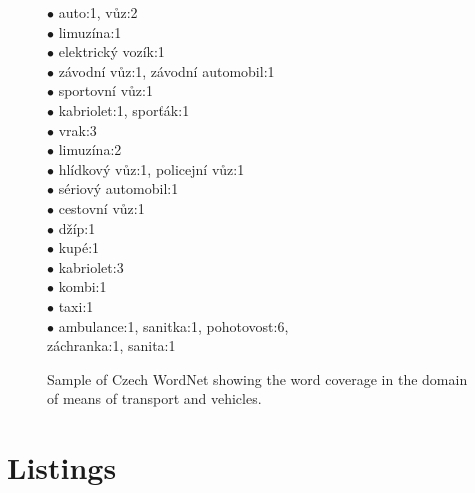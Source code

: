 \begin{figure}
{{\begin{multicols}{2}
\hspace*{0cm}$\bullet$ auto:1, vůz:2\\
\hspace*{1cm}$\bullet$ limuzína:1\\
\hspace*{1cm}$\bullet$ elektrický vozík:1\\
\hspace*{1cm}$\bullet$ závodní vůz:1, závodní automobil:1\\
\hspace*{1cm}$\bullet$ sportovní vůz:1\\
\hspace*{1cm}$\bullet$ kabriolet:1, sporťák:1\\
\hspace*{1cm}$\bullet$ vrak:3\\
\hspace*{1cm}$\bullet$ limuzína:2\\
\hspace*{1cm}$\bullet$ hlídkový vůz:1, policejní vůz:1\\
\hspace*{1cm}$\bullet$ sériový automobil:1\\
\hspace*{1cm}$\bullet$ cestovní vůz:1\\
\hspace*{1cm}$\bullet$ džíp:1\\
\hspace*{1cm}$\bullet$ kupé:1\\
\hspace*{1cm}$\bullet$ kabriolet:3\\
\hspace*{1cm}$\bullet$ kombi:1\\
\hspace*{1cm}$\bullet$ taxi:1\\
\hspace*{1cm}$\bullet$ ambulance:1, sanitka:1, pohotovost:6,\\
\hspace*{2cm} záchranka:1, sanita:1
\end{multicols}
\setlength{\columnsep}{5cm}
}}
	\caption{Sample of Czech WordNet showing the word coverage in the domain of means of transport and vehicles.}
	\label{fig:chX_czWordNet}
\end{figure}



\section{Listings}

